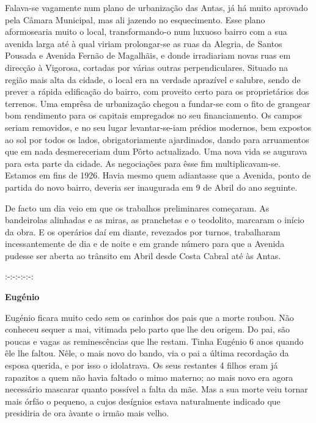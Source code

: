 \documentclass[9pt]{article}
\begin{document}
Falava-se vagamente num plano de urbaniza\-ção das Antas, já há muito aprovado pela Câmara Municipal, mas ali jazendo no esquecimento.
Esse plano aformosearia muito o local, transformando-o num luxuoso bairro
com a sua avenida larga até à qual viriam prolongar-se as ruas da Alegria, de Santos Pousada e Avenida Fernão de Maga\-lhãis, e donde irradiariam novas ruas em direc\-ção à Vigorosa, cortadas por várias outras perpendiculares. Situado na região mais alta da cidade, o local era na verdade aprazível e salubre, sendo de prever a rápida edifi\-ca\-ção do bairro, com proveito certo para os proprietários dos terrenos. Uma emprêsa
de urbaniza\-ção chegou a fundar-se com o fito de grangear bom rendimento para os capitais empregados no seu financiamento. Os campos seriam
removidos, e no seu lugar levantar-se-iam prédios modernos, bem expostos ao sol por todos os lados, obrigatoriamente ajardinados, dando para
arruamentos que em nada desmereceriam dum Pôrto actualizado. Uma nova
vida se augurava para esta parte da cidade. As negocia\-ções para êsse
fim multiplicavam-se. Estamos em fins de 1926. Havia mesmo quem adiantasse que a Avenida, ponto de partida do novo bairro, deveria ser inaugurada em 9 de Abril do ano seguinte.

De facto um dia veio em que os traba\-lhos preliminares começaram.
As bandeirolas alinhadas e as miras, as pranchetas e o teodolito, marcaram o início da obra. E os operários daí em diante, revezados por
turnos, traba\-lharam incessantemente de dia e de noite e em gran\-de número para que a Avenida pudesse ser aberta ao trânsito em Abril desde Costa Cabral até às Antas.

\begin{center}
:-:-:-:-:-:
\end{center}


\begin{center}\bf\large Eugé\-nio\end{center}

Eugé\-nio fi\-cara muito cedo sem os carinhos dos pais que a morte roubou. Não conheceu sequer a mai, vitimada pelo parto que lhe deu origem.
Do pai, são poucas e vagas as reminescências que lhe restam. Tinha Eugé\-nio
6 anos quan\-do êle lhe faltou. Nêle, o mais novo do bando, via o pai a última recorda\-ção da esposa querida, e por isso o idolatrava. Os seus restantes 4 fi\-lhos eram já rapazitos a quem não havia faltado o mimo materno; ao mais novo era agora necessário mascarar quanto possível a falta
da mãe. Mas a sua morte veiu tornar mais órfão o pequeno, a cujos desígnios estava naturalmente indicado que presidiria de ora àvante o irmão
mais ve\-lho.
\end{document}
